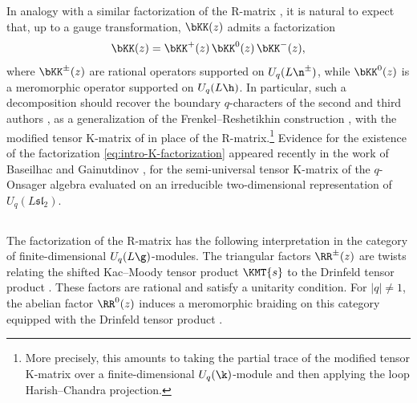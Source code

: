 \documentclass[reqno]{amsart}
\numberwithin{equation}{section}
\begin{document}
In analogy with a similar factorization of the R-matrix \cite{khoroshkin-tolstoy-93, levendorskii-soibelman-stukopin-93, beck-kac-96, damiani-98}, it is natural to expect that, up to a gauge transformation, $\bKK(z)$ admits
a factorization
\begin{equation}\label{eq:intro-K-factorization}
	\bKK(z)=\bKK^+(z)\,\bKK^0(z)\,\bKK^-(z),
\end{equation}
where $\bKK^\pm(z)$ are rational operators supported on $U_q(L\n^\pm)$,
while $\bKK^0(z)$ is a meromorphic operator supported on 
$U_q(L\h)$.
In particular, such a decomposition should recover the boundary $q$-characters of the 
second and third authors \cite{Przez-23, li-przezdziecki-25, LP-eval, 
li-przezdziecki-26}, as a generalization of the Frenkel--Reshetikhin construction 
\cite{frenkel-reshetikhin-98}, with the modified tensor K-matrix of \cite{appel-vlaar-25c} 
in place of the R-matrix.\footnote{
More precisely, this amounts to taking the partial trace of the modified tensor K-matrix 
over a finite-dimensional $U_q(\k)$-module and then applying the loop Harish--Chandra 
projection.}
Evidence for the existence of the factorization \eqref{eq:intro-K-factorization}
appeared recently in the work of Baseilhac and Gainutdinov
\cite[Thm.~4.13]{baseilhac-gainutdinov-26}, for the semi-universal tensor K-matrix 
of the $q$-Onsager algebra evaluated on an irreducible two-dimensional representation of $U_q(L\mathfrak{sl}_2)$.

\subsection{}
The factorization of the R-matrix has the following interpretation in the category of 
finite-dimensional $U_q(L\g)$-modules.
The triangular factors $\RR^{\pm}(z)$ are twists relating the shifted Kac--Moody tensor 
product $\KMT{ s}$ to the Drinfeld tensor product
\cite{khoroshkin-tolstoy-94, enriquez-khoroshkin-pakuliak-07, damiani-24}.
These factors are rational and satisfy a unitarity condition. 
For $|q|\neq1$, the abelian factor $\RR^0(z)$ induces a meromorphic braiding on this category equipped with the Drinfeld tensor product \cite{gautam-toledano-17}.\\
\end{document}
